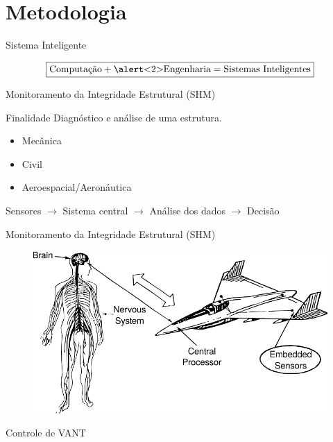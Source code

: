 \section{Metodologia}

\begin{frame}{Sistema Inteligente}

\[\boxed{\text{Computação} + \text{\alert<2>{Engenharia}} = \text{Sistemas Inteligentes}}\] 
    
\end{frame}

\begin{frame}{Monitoramento da Integridade Estrutural (SHM)}

\begin{block}{Finalidade}
    Diagnóstico e análise de uma estrutura.
\end{block} \pause

\begin{itemize}
    \item Mecânica
    \item Civil
    \item Aeroespacial/Aeronáutica
\end{itemize}

Sensores \(\rightarrow\) Sistema central \(\rightarrow\) \alert<3>{Análise dos dados} \(\rightarrow\) Decisão
\end{frame}

\begin{frame}{Monitoramento da Integridade Estrutural (SHM)}

\begin{figure}
    \centering
    \includegraphics{../../report/figures/2review/shm/shm_nervous_system.pdf}
\end{figure}
    
\end{frame}

\begin{frame}{Controle de VANT}
    
\end{frame}